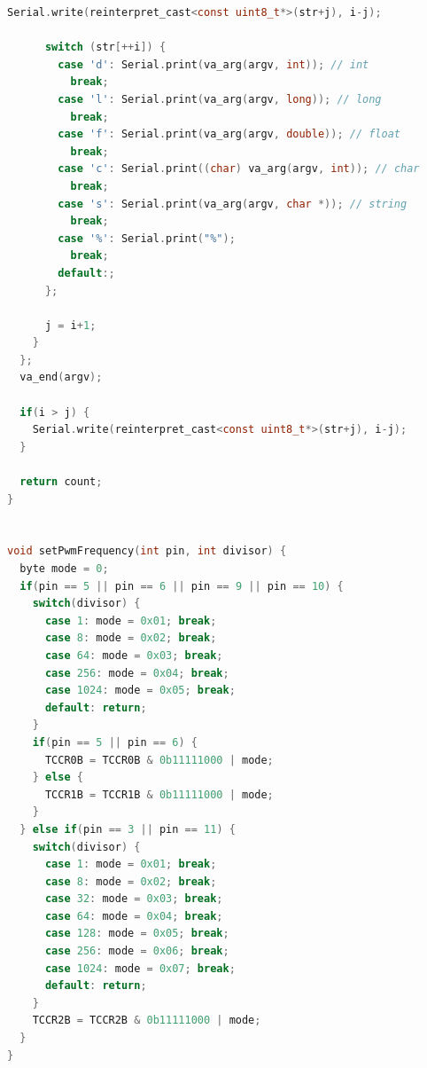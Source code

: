 \documentclass[conference]{IEEEtran}
\begin{document}
\begin{lstlisting}[language=c]
      Serial.write(reinterpret_cast<const uint8_t*>(str+j), i-j);

      switch (str[++i]) {
        case 'd': Serial.print(va_arg(argv, int)); // int  
          break;
        case 'l': Serial.print(va_arg(argv, long)); // long 
          break;
        case 'f': Serial.print(va_arg(argv, double)); // float
          break;
        case 'c': Serial.print((char) va_arg(argv, int)); // char
          break;
        case 's': Serial.print(va_arg(argv, char *)); // string
          break;
        case '%': Serial.print("%");
          break;
        default:;
      };

      j = i+1;
    }
  };
  va_end(argv);

  if(i > j) {
    Serial.write(reinterpret_cast<const uint8_t*>(str+j), i-j);
  }

  return count;
}


void setPwmFrequency(int pin, int divisor) {
  byte mode = 0;
  if(pin == 5 || pin == 6 || pin == 9 || pin == 10) {
    switch(divisor) {
      case 1: mode = 0x01; break;
      case 8: mode = 0x02; break;
      case 64: mode = 0x03; break;
      case 256: mode = 0x04; break;
      case 1024: mode = 0x05; break;
      default: return;
    }
    if(pin == 5 || pin == 6) {
      TCCR0B = TCCR0B & 0b11111000 | mode;
    } else {
      TCCR1B = TCCR1B & 0b11111000 | mode;
    }
  } else if(pin == 3 || pin == 11) {
    switch(divisor) {
      case 1: mode = 0x01; break;
      case 8: mode = 0x02; break;
      case 32: mode = 0x03; break;
      case 64: mode = 0x04; break;
      case 128: mode = 0x05; break;
      case 256: mode = 0x06; break;
      case 1024: mode = 0x07; break;
      default: return;
    }
    TCCR2B = TCCR2B & 0b11111000 | mode;
  }
}

\end{lstlisting}
















\end{document}
